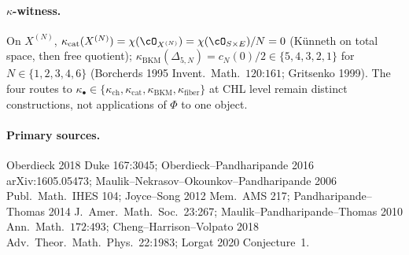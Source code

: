 \paragraph{$\kappa$-witness.} On $X^{(N)}$, $\kappa_{\mathrm{cat}}
(X^{(N)})=\chi(\cO_{X^{(N)}})=\chi(\cO_{S\times E})/N=0$ (K\"unneth
on total space, then free quotient); $\kappa_{\mathrm{BKM}}
(\Delta_{5,N})=c_N(0)/2\in\{5,4,3,2,1\}$ for $N\in\{1,2,3,4,6\}$
(Borcherds 1995 Invent.~Math.~$120$:$161$; Gritsenko 1999). The four
routes to $\kappa_{\bullet}\in\{\kappa_{\mathrm{ch}},\kappa_{\mathrm{cat}},
\kappa_{\mathrm{BKM}},\kappa_{\mathrm{fiber}}\}$ at CHL level remain
distinct constructions, not applications of $\Phi$ to one object.

\paragraph{Primary sources.} Oberdieck 2018 Duke 167:3045;
Oberdieck--Pandharipande 2016 arXiv:1605.05473;
Maulik--Nekrasov--Okounkov--Pandharipande 2006 Publ.~Math.~IHES 104;
Joyce--Song 2012 Mem.~AMS 217; Pandharipande--Thomas 2014
J.~Amer.~Math.~Soc.~23:267; Maulik--Pandharipande--Thomas 2010
Ann.~Math.~$172$:$493$; Cheng--Harrison--Volpato 2018
Adv.~Theor.~Math.~Phys.~22:1983; Lorgat 2020 Conjecture~1.
